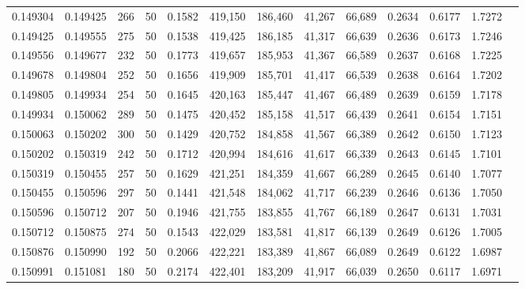\begin{tabular}{rrrrrrrrrrrrr}
0.149304 & 0.149425 &   266 &  50 &                                     0.1582 & 419,150 & 186,460 &  41,267 &  66,689 & 0.2634 & 0.6177 & 1.7272 \\
0.149425 & 0.149555 &   275 &  50 &                                     0.1538 & 419,425 & 186,185 &  41,317 &  66,639 & 0.2636 & 0.6173 & 1.7246 \\
0.149556 & 0.149677 &   232 &  50 &                                     0.1773 & 419,657 & 185,953 &  41,367 &  66,589 & 0.2637 & 0.6168 & 1.7225 \\
0.149678 & 0.149804 &   252 &  50 &                                     0.1656 & 419,909 & 185,701 &  41,417 &  66,539 & 0.2638 & 0.6164 & 1.7202 \\
0.149805 & 0.149934 &   254 &  50 &                                     0.1645 & 420,163 & 185,447 &  41,467 &  66,489 & 0.2639 & 0.6159 & 1.7178 \\
0.149934 & 0.150062 &   289 &  50 &                                     0.1475 & 420,452 & 185,158 &  41,517 &  66,439 & 0.2641 & 0.6154 & 1.7151 \\
0.150063 & 0.150202 &   300 &  50 &                                     0.1429 & 420,752 & 184,858 &  41,567 &  66,389 & 0.2642 & 0.6150 & 1.7123 \\
0.150202 & 0.150319 &   242 &  50 &                                     0.1712 & 420,994 & 184,616 &  41,617 &  66,339 & 0.2643 & 0.6145 & 1.7101 \\
0.150319 & 0.150455 &   257 &  50 &                                     0.1629 & 421,251 & 184,359 &  41,667 &  66,289 & 0.2645 & 0.6140 & 1.7077 \\
0.150455 & 0.150596 &   297 &  50 &                                     0.1441 & 421,548 & 184,062 &  41,717 &  66,239 & 0.2646 & 0.6136 & 1.7050 \\
0.150596 & 0.150712 &   207 &  50 &                                     0.1946 & 421,755 & 183,855 &  41,767 &  66,189 & 0.2647 & 0.6131 & 1.7031 \\
0.150712 & 0.150875 &   274 &  50 &                                     0.1543 & 422,029 & 183,581 &  41,817 &  66,139 & 0.2649 & 0.6126 & 1.7005 \\
0.150876 & 0.150990 &   192 &  50 &                                     0.2066 & 422,221 & 183,389 &  41,867 &  66,089 & 0.2649 & 0.6122 & 1.6987 \\
0.150991 & 0.151081 &   180 &  50 &                                     0.2174 & 422,401 & 183,209 &  41,917 &  66,039 & 0.2650 & 0.6117 & 1.6971 \\

\end{tabular}

